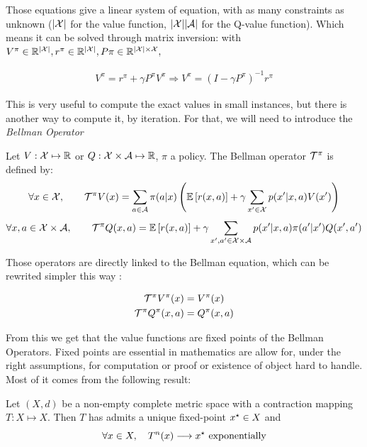 Those equations give a linear system of equation, with as many constraints as unknown ($|\mathcal{X}|$ for the value function, $|\mathcal{X}||\mathcal{A}|$ for the Q-value function). Which means it can be solved through matrix inversion: with $V^\pi \in \mathbb{R}^{|\mathcal{X}|}, r^\pi \in \mathbb{R}^{|\mathcal{X}|}, P\pi \in \mathbb{R}^{|\mathcal{X}|\times \mathcal{X}},$

\begin{align*}
    V^\pi = r^\pi + \gamma P^\pi V^\pi \Longrightarrow V^\pi =  \left(I - \gamma P^\pi\right)^{-1}r^\pi
\end{align*}

This is very useful to compute the exact values in small instances, but there is another way to compute it, by iteration. For that, we will need to introduce the \emph{Bellman Operator}

\begin{definition}
Let $V: \mathcal{X} \mapsto \mathbb{R}$ or $Q: \mathcal{X} \times \mathcal{A} \mapsto \mathbb{R}$, $\pi$ a policy. The Bellman operator $\mathcal{T}^\pi$ is defined by:
\[ \forall x \in \mathcal{X}, \qquad \mathcal{T}^\pi V(x) = \sum_{a \in \mathcal{A}} \pi(a|x) \left( \mathbb{E}\left[ r(x,a) \right] + \gamma \sum_{x^\prime  \in \mathcal{X}} p(x^\prime |x,a)V(x^\prime ) \right) \]
\[ \forall x,a \in \mathcal{X} \times \mathcal{A}, \qquad \mathcal{T}^\pi Q(x,a) = \mathbb{E}\left[ r(x,a) \right] + \gamma \sum_{x^\prime ,a^\prime  \in \mathcal{X} \times \mathcal{A}} p(x^\prime |x,a)\pi(a^\prime |x^\prime )Q(x^\prime ,a^\prime ) \]
\end{definition}

Those operators are directly linked to the Bellman equation, which can be rewrited simpler this way :

\begin{align*}
    \mathcal{T}^\pi V^\pi(x) &=  V^\pi(x)  \\
    \mathcal{T}^\pi Q^\pi(x,a) &= Q^\pi(x,a) 
\end{align*}

From this we get that the value functions are fixed points of the Bellman Operators. Fixed points are essential in mathematics are allow for, under the right assumptions, for computation or proof or existence of object hard to handle. Most of it comes from the following result:

\begin{theorem}
Let $( X , d )$ be a non-empty complete metric space with a contraction mapping $ T : X \mapsto X$. Then $T$ has admits a unique fixed-point $x^{\star}\in X$ and
\[ \forall x \in X, \quad T^n(x) \longrightarrow x^{\star} \text{ exponentially} \]
\end{theorem}

